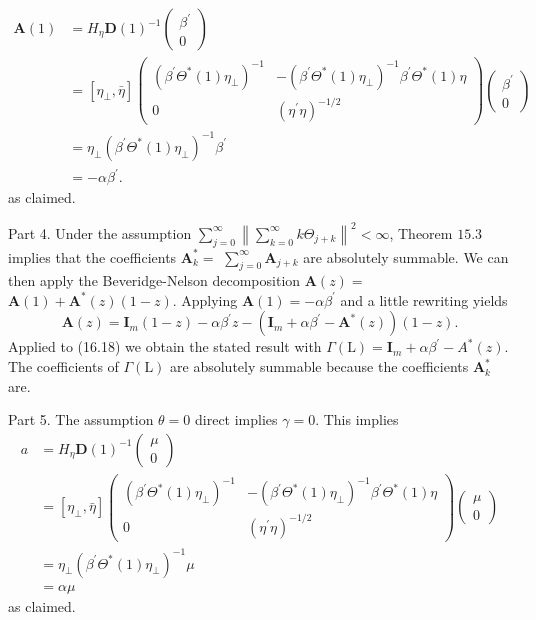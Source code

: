 \documentclass[10pt]{article}
\begin{document}
$$
\begin{aligned}
\boldsymbol{A}(1) &=H_{\eta} \boldsymbol{D}(1)^{-1}\left(\begin{array}{c}
\beta^{\prime} \\
0
\end{array}\right) \\
&=\left[\eta_{\perp}, \bar{\eta}\right]\left(\begin{array}{cc}
\left(\beta^{\prime} \Theta^{*}(1) \eta_{\perp}\right)^{-1} & -\left(\beta^{\prime} \Theta^{*}(1) \eta_{\perp}\right)^{-1} \beta^{\prime} \Theta^{*}(1) \eta \\
0 & \left(\eta^{\prime} \eta\right)^{-1 / 2}
\end{array}\right)\left(\begin{array}{c}
\beta^{\prime} \\
0
\end{array}\right) \\
&=\eta_{\perp}\left(\beta^{\prime} \Theta^{*}(1) \eta_{\perp}\right)^{-1} \beta^{\prime} \\
&=-\alpha \beta^{\prime} .
\end{aligned}
$$
as claimed.

Part 4. Under the assumption $\sum_{j=0}^{\infty}\left\|\sum_{k=0}^{\infty} k \Theta_{j+k}\right\|^{2}<\infty$, Theorem $15.3$ implies that the coefficients $\boldsymbol{A}_{k}^{*}=$ $\sum_{j=0}^{\infty} \boldsymbol{A}_{j+k}$ are absolutely summable. We can then apply the Beveridge-Nelson decomposition $\boldsymbol{A}(z)=$ $\boldsymbol{A}(1)+\boldsymbol{A}^{*}(z)(1-z)$. Applying $\boldsymbol{A}(1)=-\alpha \beta^{\prime}$ and a little rewriting yields
$$
\boldsymbol{A}(z)=\boldsymbol{I}_{m}(1-z)-\alpha \beta^{\prime} z-\left(\boldsymbol{I}_{m}+\alpha \beta^{\prime}-\boldsymbol{A}^{*}(z)\right)(1-z) .
$$
Applied to (16.18) we obtain the stated result with $\Gamma(\mathrm{L})=\boldsymbol{I}_{m}+\alpha \beta^{\prime}-A^{*}(z)$. The coefficients of $\Gamma(\mathrm{L})$ are absolutely summable because the coefficients $\boldsymbol{A}_{k}^{*}$ are.

Part 5. The assumption $\theta=0$ direct implies $\gamma=0$. This implies
$$
\begin{aligned}
a &=H_{\eta} \boldsymbol{D}(1)^{-1}\left(\begin{array}{c}
\mu \\
0
\end{array}\right) \\
&=\left[\eta_{\perp}, \bar{\eta}\right]\left(\begin{array}{cc}
\left(\beta^{\prime} \Theta^{*}(1) \eta_{\perp}\right)^{-1} & -\left(\beta^{\prime} \Theta^{*}(1) \eta_{\perp}\right)^{-1} \beta^{\prime} \Theta^{*}(1) \eta \\
0 & \left(\eta^{\prime} \eta\right)^{-1 / 2}
\end{array}\right)\left(\begin{array}{c}
\mu \\
0
\end{array}\right) \\
&=\eta_{\perp}\left(\beta^{\prime} \Theta^{*}(1) \eta_{\perp}\right)^{-1} \mu \\
&=\alpha \mu
\end{aligned}
$$
as claimed.
\end{document}
